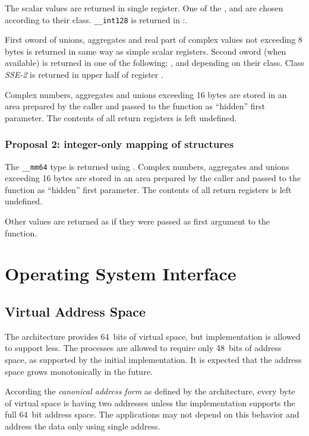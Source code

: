 The scalar values are returned in single register. One of the
\RAX,  and  are chosen according to their class.
\verb|__int128| is returned in \RDX:\RAX.

First oword of unions, aggregates and real part of complex values not exceeding
8 bytes is returned in same way as simple scalar registers.  Second oword
(when available) is returned in one of the following: \RAX,  and
 depending on their class.  Class \emph{SSE-2} is returned in upper
half of register .

Complex numbers, aggregates and unions exceeding 16 bytes are stored
in an area prepared by the caller and passed to the function as
``hidden'' first parameter.  The contents of all return registers is
left undefined.

\subsubsection {Proposal 2: integer-only mapping of structures}

The \verb|__mm64| type is returned using .  Complex numbers,
aggregates and unions exceeding 16 bytes are stored in an area prepared by the
caller and passed to the function as ``hidden'' first parameter.  The contents
of all return registers is left undefined.

Other values are returned as if they were passed as first argument to
the function.

\section{Operating System Interface}

\subsection{Virtual Address Space}

The \xARCH architecture provides 64~bits of virtual space, but
implementation is allowed to support less. The processes are allowed
to require only 48~bits of address space, as supported by the initial
implementation.  It is expected that the address space grows
monotonically in the future.

According the \emph{canonical address form} as defined by the \xARCH
architecture, every byte of virtual space is having two addresses unless the
implementation supports the full 64~bit address space.  The applications may not
depend on this behavior and address the data only using single address.

